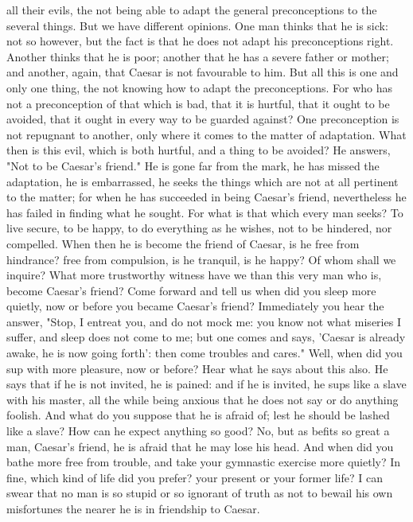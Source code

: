 \documentclass[a4paper]{article}
\begin{document}
all their evils, the not being able to adapt the general preconceptions to the
several things. But we have different opinions. One man thinks that he is sick:
not so however, but the fact is that he does not adapt his preconceptions
right. Another thinks that he is poor; another that he has a severe father or
mother; and another, again, that Caesar is not favourable to him. But all this
is one and only one thing, the not knowing how to adapt the preconceptions. For
who has not a preconception of that which is bad, that it is hurtful, that it
ought to be avoided, that it ought in every way to be guarded against? One
preconception is not repugnant to another, only where it comes to the matter of
adaptation. What then is this evil, which is both hurtful, and a thing to be
avoided? He answers, "Not to be Caesar's friend." He is gone far from the mark,
he has missed the adaptation, he is embarrassed, he seeks the things which are
not at all pertinent to the matter; for when he has succeeded in being Caesar's
friend, nevertheless he has failed in finding what he sought. For what is that
which every man seeks? To live secure, to be happy, to do everything as he
wishes, not to be hindered, nor compelled. When then he is become the friend of
Caesar, is he free from hindrance? free from compulsion, is he tranquil, is he
happy? Of whom shall we inquire? What more trustworthy witness have we than
this very man who is, become Caesar's friend? Come forward and tell us when did
you sleep more quietly, now or before you became Caesar's friend? Immediately
you hear the answer, "Stop, I entreat you, and do not mock me: you know not
what miseries I suffer, and sleep does not come to me; but one comes and says,
'Caesar is already awake, he is now going forth': then come troubles and
cares." Well, when did you sup with more pleasure, now or before? Hear what he
says about this also. He says that if he is not invited, he is pained: and if
he is invited, he sups like a slave with his master, all the while being
anxious that he does not say or do anything foolish. And what do you suppose
that he is afraid of; lest he should be lashed like a slave? How can he expect
anything so good? No, but as befits so great a man, Caesar's friend, he is
afraid that he may lose his head. And when did you bathe more free from
trouble, and take your gymnastic exercise more quietly? In fine, which kind of
life did you prefer? your present or your former life? I can swear that no man
is so stupid or so ignorant of truth as not to bewail his own misfortunes the
nearer he is in friendship to Caesar.
\end{document}
